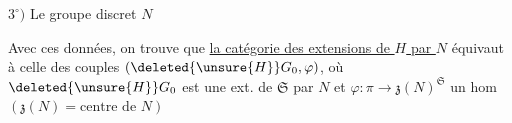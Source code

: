 
\(3^\circ)\) Le groupe discret \(N\)

Avec ces données, on trouve que \uline{la catégorie des extensions de \(H\) par \(N\)} équivaut à celle des couples \((\deleted{\unsure{H}}G_0,\varphi)\), où \(\deleted{\unsure{H}}G_0\) est une ext. de \(\mathfrak{S}\) par \(N\) et \(\varphi:\pi\longrightarrow\mathfrak{z}(N)^{\mathfrak{S}}\) un hom \((\mathfrak{z}(N)=\text{centre de }N)\)

